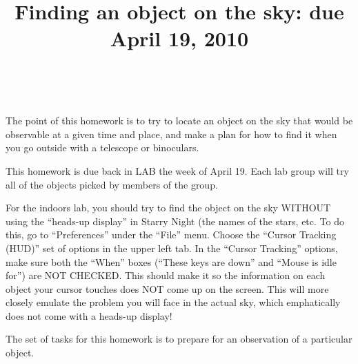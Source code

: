 \documentclass[11pt, preprint]{aastex}
\begin{document}
\title{\bf Finding an object on the sky: due April 19, 2010}

~
\vspace{-30pt}

\noindent The point of this homework is to try to locate an object on
the sky that would be observable at a given time and place, and make a
plan for how to find it when you go outside with a telescope or
binoculars.

\noindent This homework is due back in LAB the week of April 19. 
Each lab group will try all of the
objects picked by members of the group.

\noindent For the indoors lab, you should try to find the object on
the sky WITHOUT using the ``heads-up display'' in Starry Night (the
names of the stars, etc.  To do this, go to ``Preferences'' under the
``File'' menu.  Choose the ``Cursor Tracking (HUD)'' set of options in
the upper left tab.  In the ``Cursor Tracking'' options, make sure
both the ``When'' boxes (``These keys are down'' and ``Mouse is idle
for'') are NOT CHECKED. This should make it so the information on each
object your cursor touches does NOT come up on the screen.  This will
more closely emulate the problem you will face in the actual sky,
which emphatically does not come with a heads-up display!

\noindent The set of tasks for this homework is to prepare for an
observation of a particular object. 
\end{document}
